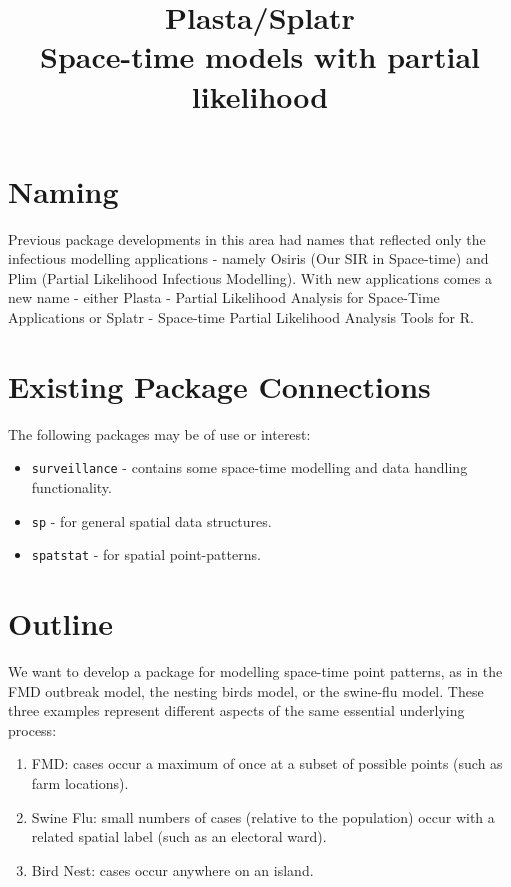 \documentclass{article}
\title{{\sc Plasta}/{\sc Splatr} \\ Space-time models with partial likelihood}
\begin{document}
\maketitle

\section*{Naming}
Previous package developments in this area had names that reflected only the infectious modelling 
applications - namely {\sc Osiris} (Our SIR in Space-time)  and {\sc Plim} (Partial Likelihood Infectious Modelling). 
With new applications comes a new name - either {\sc Plasta} - Partial Likelihood Analysis for Space-Time Applications or
{\sc Splatr} - Space-time Partial Likelihood Analysis Tools for R.

\section*{Existing Package Connections}
The following packages may be of use or interest:
\begin{itemize}
\item {\tt surveillance} - contains some space-time modelling and data handling functionality.
\item {\tt sp} - for general spatial data structures.
\item {\tt spatstat} - for spatial point-patterns.
\end{itemize}

\section*{Outline}

We want to develop a package for modelling space-time point patterns, as in the FMD outbreak model,
the nesting birds model, or the swine-flu model. These three examples represent different aspects of the
same essential underlying process:

\begin{enumerate}
\item FMD: cases occur a maximum of once at a subset of possible points (such as farm locations).
\item Swine Flu: small numbers of cases (relative to the population) occur 
with a related spatial label (such as an electoral ward).
\item Bird Nest: cases occur anywhere on an island.
\end{enumerate}
\end{document}

